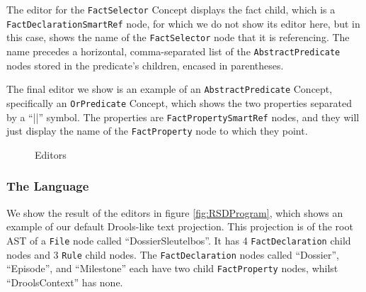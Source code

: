 The editor for the \texttt{FactSelector} Concept displays the fact child, which is a \texttt{FactDeclarationSmartRef} node, for which we do not show its editor here, but in this case, shows the name of the \texttt{FactSelector} node that it is referencing.
The name precedes a horizontal, comma-separated list of the \texttt{AbstractPredicate} nodes stored in the predicate's children, encased in parentheses.

The final editor we show is an example of an \texttt{AbstractPredicate} Concept, specifically an \texttt{OrPredicate} Concept, which shows the two properties separated by a ``||'' symbol.
The properties are \texttt{FactPropertySmartRef} nodes, and they will just display the name of the \texttt{FactProperty} node to which they point.

\begin{figure}[h]
    \centering
    \caption{Editors}
    \label{fig:RSDEditors}
\end{figure}

\subsubsection{The Language}
We show the result of the editors in figure \ref{fig:RSDProgram}, which shows an example of our default Drools-like text projection. 
This projection is of the root AST of a \texttt{File} node called ``DossierSleutelbos''.
It has 4 \texttt{FactDeclaration} child nodes and 3 \texttt{Rule} child nodes.
The \texttt{FactDeclaration} nodes called ``Dossier'', ``Episode'', and ``Milestone'' each have two child \texttt{FactProperty} nodes, whilst ``DroolsContext'' has none.


